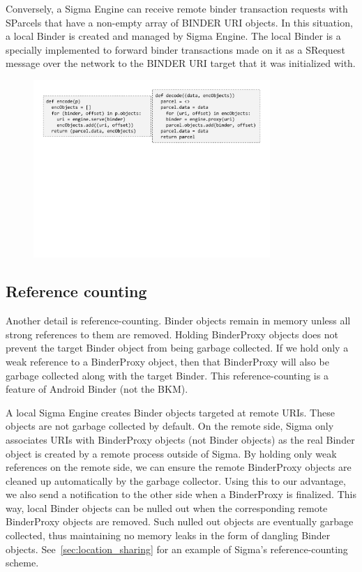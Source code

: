 \documentclass[prodmode]{acmlarge}
\begin{document}
Conversely, a Sigma Engine can receive remote binder transaction requests with SParcels that have a non-empty array of BINDER URI objects. In this situation, a local Binder is created and managed by Sigma Engine. The local Binder is a specially implemented to forward binder transactions made on it as a SRequest message over the network to the BINDER URI target that it was initialized with.


\begin{figure}[h]
\centering
\includegraphics[width=0.8\textwidth]{drawings/encodeObjects.pdf}
\end{figure}

\subsection{Reference counting}
Another detail is reference-counting. Binder objects remain in memory unless all strong references to them are removed. Holding BinderProxy objects does not prevent the target Binder object from being garbage collected. If we hold only a weak reference to a BinderProxy object, then that BinderProxy will also be garbage collected along with the target Binder. This reference-counting is a feature of Android Binder (not the BKM).

A local Sigma Engine creates Binder objects targeted at remote URIs. These objects are not garbage collected by default. On the remote side, Sigma only associates URIs with BinderProxy objects (not Binder objects) as the real Binder object is created by a remote process outside of Sigma. By holding only weak references on the remote side, we can ensure the remote BinderProxy objects are cleaned up automatically by the garbage collector. Using this to our advantage, we also send a notification to the other side when a BinderProxy is finalized. This way, local Binder objects can be nulled out when the corresponding remote BinderProxy objects are removed. Such nulled out objects are eventually garbage collected, thus maintaining no memory leaks in the form of dangling Binder objects. See~\ref{sec:location_sharing} for an example of Sigma's reference-counting scheme.
\end{document}
